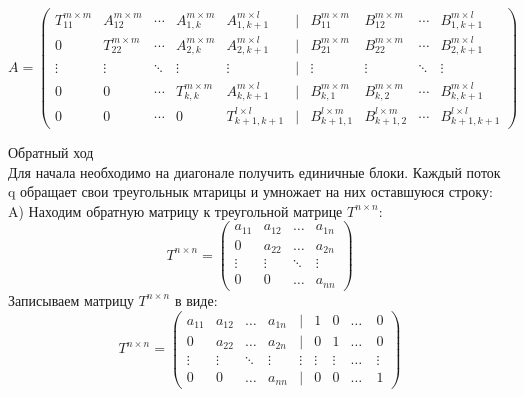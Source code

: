 \documentclass[a4paper,12pt]{article}
\begin{document}
\begin{equation}
A=
  \begin{pmatrix} 
    T_{11}^{m \times m} & A_{12}^{m \times m} & \cdots & A_{1,k}^{m \times m} & A_{1,k+1}^{m \times l} & | & B_{11}^{m \times m} &  B_{12}^{m \times m} & \cdots & B_{1,k+1}^{m \times l}\\
    0 & T_{22}^{m \times m} & \cdots & A_{2,k}^{m \times m} & A_{2,k+1}^{m \times l} & | & B_{21}^{m \times m} &  B_{22}^{m \times m} & \cdots & B_{2,k+1}^{m \times l}\\
    \vdots & \vdots & \ddots & \vdots & \vdots & | & \vdots & \vdots & \ddots & \vdots\\ 
    0 & 0 & \cdots & T_{k,k}^{m \times m} & A_{k,k+1}^{m \times l} & | & B_{k,1}^{m \times m} &  B_{k,2}^{m \times m} & \cdots & B_{k,k+1}^{m \times l}\\
    0 & 0 & \cdots & 0 & T_{k+1,k+1}^{l \times l} & | & B_{k+1,1}^{l \times m} &  B_{k+1,2}^{l \times m} & \cdots & B_{k+1,k+1}^{l \times l} 
  \end{pmatrix}
\end{equation}

{\fontsize{14}{14}\selectfont Обратный ход}\\

Для начала необходимо на диагонале получить единичные блоки.
Каждый поток q обращает свои треугольнык мтарицы и умножает на них оставшуюся строку:\\

A) Находим обратную матрицу к треугольной матрице $T^{n\times n}$: 
$$T^{n\times n}=
   \begin{pmatrix}
     a_{11}& a_{12} &\ldots & a_{1n}\\
     0& a_{22} &\ldots & a_{2n}\\
     \vdots& \vdots &\ddots & \vdots\\
     0& 0 &\ldots & a_{nn}
    \end{pmatrix}
$$ 
Записываем матрицу $T^{n\times n}$ в виде:
$$T^{n\times n}=
   \begin{pmatrix}
     a_{11}& a_{12} &\ldots & a_{1n} & | & 1 & 0 & \ldots \ & 0\\
     0& a_{22} &\ldots & a_{2n} & | & 0 & 1 & \ldots \ & 0\\
     \vdots& \vdots &\ddots & \vdots &\vdots& \vdots &\vdots & \ldots & \vdots \\
     0& 0 &\ldots & a_{nn} & | & 0 & 0 & \ldots \ & 1
    \end{pmatrix}
$$ 
\end{document}
